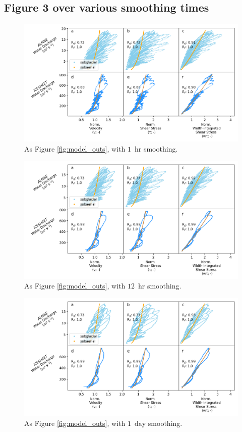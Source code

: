 \documentclass[draft]{agujournal2019}
\newcommand{\unit}[1]{$\mathrm{#1}$}
\begin{document}
\subsection{Figure 3 over various smoothing times}

\begin{center}
  \begin{figure}[!h]
    \includegraphics[width=0.7\linewidth]{Fig3_hr.png}
    \caption{As Figure \ref{fig:model_outs}, with $1$ \,\unit{hr} smoothing.}
    \label{fig:model_outs_1hr}
  \end{figure}
\end{center}

\begin{center}
  \begin{figure}[!h]
    \includegraphics[width=0.7\linewidth]{Fig3_12hr.png}
    \caption{As Figure \ref{fig:model_outs}, with $12$ \,\unit{hr} smoothing.}
    \label{fig:model_outs_12hr}
  \end{figure}
\end{center}


\begin{center}
  \begin{figure}[!h]
    \includegraphics[width=0.7\linewidth]{Fig3_1day.png}
    \caption{As Figure \ref{fig:model_outs}, with $1$ \,\unit{day} smoothing.}
    \label{fig:model_outs_1day}
  \end{figure}
\end{center}
\end{document}
